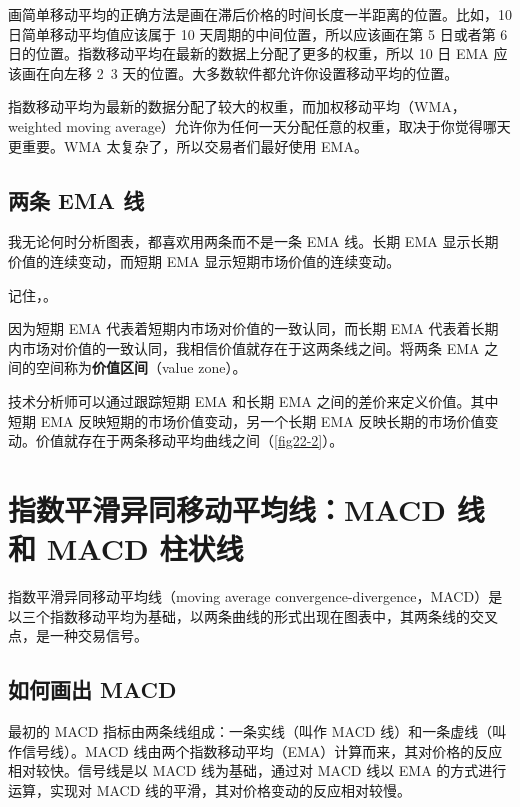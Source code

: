 画简单移动平均的正确方法是画在滞后价格的时间长度一半距离的位置。比如，10 日简单移动平均值应该属于 10 天周期的中间位置，所以应该画在第 5 日或者第 6 日的位置。指数移动平均在最新的数据上分配了更多的权重，所以 10 日 EMA 应该画在向左移 2~3 天的位置。大多数软件都允许你设置移动平均的位置。


指数移动平均为最新的数据分配了较大的权重，而加权移动平均（WMA，weighted moving average）允许你为任何一天分配任意的权重，取决于你觉得哪天更重要。WMA 太复杂了，所以交易者们最好使用 EMA。
\subsection*{两条 EMA 线}
我无论何时分析图表，都喜欢用两条而不是一条 EMA 线。长期 EMA 显示长期价值的连续变动，而短期 EMA 显示短期市场价值的连续变动。

记住，。

因为短期 EMA 代表着短期内市场对价值的一致认同，而长期 EMA 代表着长期内市场对价值的一致认同，我相信价值就存在于这两条线之间。将两条 EMA 之间的空间称为\textbf{价值区间}（value zone）。

\begin{tcolorbox}[title=价格、价值以及价值区间]
    技术分析师可以通过跟踪短期 EMA 和长期 EMA 之间的差价来定义价值。其中短期 EMA 反映短期的市场价值变动，另一个长期 EMA 反映长期的市场价值变动。价值就存在于两条移动平均曲线之间（\autoref{fig22-2}）。
\end{tcolorbox}

\section{指数平滑异同移动平均线：MACD 线和 MACD 柱状线}
指数平滑异同移动平均线（moving average convergence-divergence，MACD）是以三个指数移动平均为基础，以两条曲线的形式出现在图表中，其两条线的交叉点，是一种交易信号。
\subsection{如何画出 MACD}
最初的 MACD 指标由两条线组成：一条实线（叫作 MACD 线）和一条虚线（叫作信号线）。MACD 线由两个指数移动平均（EMA）计算而来，其对价格的反应相对较快。信号线是以 MACD 线为基础，通过对 MACD 线以 EMA 的方式进行运算，实现对 MACD 线的平滑，其对价格变动的反应相对较慢。

